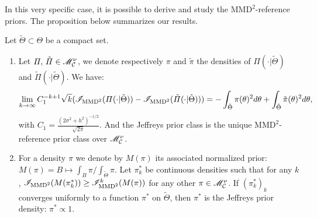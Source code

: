     In this very specific case, it is possible to derive and study the $\text{MMD}^2$-reference priors. The proposition below summarizes our results.
    
    \begin{prop}
        Let $\tilde\Theta\subset\Theta$ be a compact set. 
        \begin{enumerate}
            \item Let $\varPi,\,\tilde\varPi\in\mathscr{M}^\nu_{\mathcal{C}}$, we denote respectively $\pi$ and $\tilde\pi$ the densities of $\varPi(\cdot|\tilde\Theta)$ and $\tilde\varPi(\cdot|\tilde\Theta)$. We have:
            \begin{equation}
                \lim_{k\rightarrow\infty} C_1^{-k+1}\sqrt{k}(\mathscr{I}_{\text{MMD}^2}(\varPi(\cdot|\tilde\Theta))-\mathscr{I}_{\text{MMD}^2}(\tilde\varPi(\cdot|\tilde\Theta)) ) = -\int_{\tilde\Theta}\pi(\theta)^2d\theta + \int_{\tilde\Theta}\tilde\pi(\theta)^2d\theta,
            \end{equation}
            with $C_1=\frac{(2\sigma^2+h^2)^{-1/2}}{\sqrt{2\pi}}$.
            And the Jeffreys prior class is the unique $\text{MMD}^2$-reference prior class over $\mathscr{M}^\nu_{\mathcal{C}}$.
            \item For a density $\pi$ %
            we denote by $M(\pi)$ its associated normalized prior: $M(\pi)=B\mapsto\int_B\pi/\int_{\tilde\Theta}\pi$.
            Let $\pi^\ast_k$ be continuous densities such that for any $k$, $\mathscr{I}_{\text{MMD}^2}(M(\pi^\ast_k))\geq \mathscr{I}^k_{\text{MMD}^2}(M(\pi))$ for any other  $\pi\in\mathscr{M}^\nu_{\mathcal{C}}$.
            If $(\pi^\ast_k)_k$ converges uniformly to a function $\pi^\ast$ on $\tilde\Theta$, then $\pi^\ast$ is the Jeffreys prior density: $\pi^\ast\propto1$.
        \end{enumerate}
    \end{prop}

